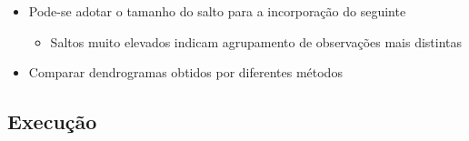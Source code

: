 \documentclass[
  letterpaper,
  DIV=11,
  numbers=noendperiod]{scrreprt}
\providecommand{\tightlist}{%
  \setlength{\itemsep}{0pt}\setlength{\parskip}{0pt}}\usepackage{longtable,booktabs,array}
\begin{document}
\begin{itemize}
\begin{itemize}
    \begin{itemize}
    \tightlist
    \item
      Pode-se adotar o tamanho do salto para a incorporação do seguinte

      \begin{itemize}
      \tightlist
      \item
        Saltos muito elevados indicam agrupamento de observações mais
        distintas\\
      \end{itemize}
    \item
      Comparar dendrogramas obtidos por diferentes métodos
    \end{itemize}
  \end{itemize}
\end{itemize}

\hypertarget{execuuxe7uxe3o}{%
\subsection{Execução}\label{execuuxe7uxe3o}}
\end{document}
